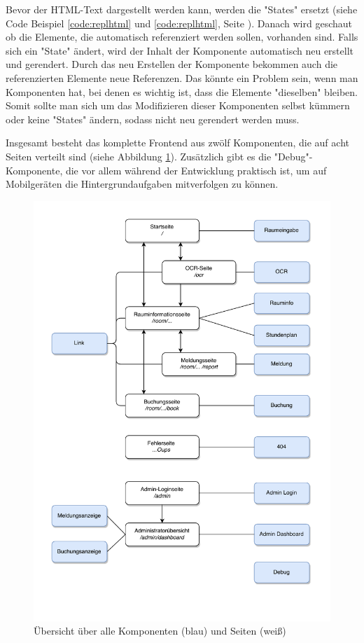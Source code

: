 Bevor der HTML-Text dargestellt werden kann, werden die "States" ersetzt (siehe Code Beispiel \ref{code:replhtml} und \ref{code:replhtml}, Seite \pageref{code:replhtml}). Danach wird geschaut ob die Elemente, die automatisch referenziert werden sollen, vorhanden sind. Falls sich ein "State" ändert, wird der Inhalt der Komponente automatisch neu erstellt und gerendert. Durch das neu Erstellen der Komponente bekommen auch die referenzierten Elemente neue Referenzen. Das könnte ein Problem sein, wenn man Komponenten hat, bei denen es wichtig ist, dass die Elemente "dieselben" bleiben. Somit sollte man sich um das Modifizieren dieser Komponenten selbst kümmern oder keine "States" ändern, sodass nicht neu gerendert werden muss.


Insgesamt besteht das komplette Frontend aus zwölf Komponenten, die auf acht Seiten verteilt sind (siehe Abbildung \ref{fig:comppageoverview}). Zusätzlich gibt es die "Debug"-Komponente, die vor allem während der Entwicklung praktisch ist, um auf Mobilgeräten die Hintergrundaufgaben mitverfolgen zu können.

\begin{figure}[H]
    \centering
    \includegraphics[width=150mm]{media/WebComponents/overview.svg.pdf}
    \caption{Übersicht über alle Komponenten (blau) und Seiten (weiß)}
    \label{fig:comppageoverview}
\end{figure}

